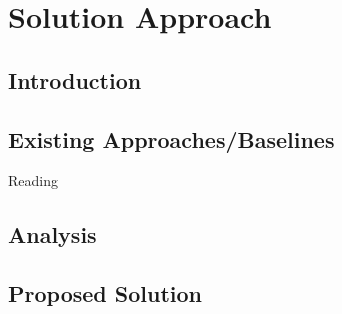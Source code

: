
\chapter{Solution Approach} %
\label{Chapter3}


\section{Introduction}
 

\section{Existing Approaches/Baselines}
Reading \cite  {SoftwE}
\section{Analysis}
\section{Proposed Solution}